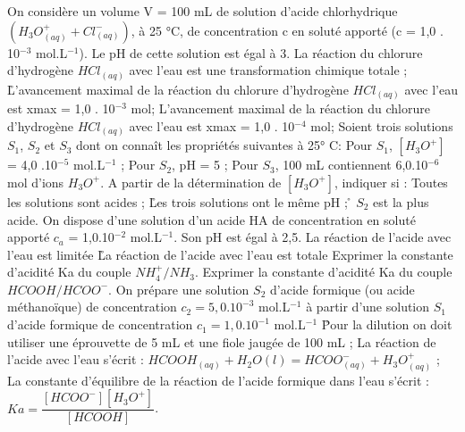 \q	
   On considère un volume V = 100 mL de solution d'acide chlorhydrique $(H_3O^+_{(aq)} + Cl^-_{(aq)})$, à 25 °C, de concentration c en soluté apporté (c = 1,0 . 10$^{-3}$ mol.L$^{-1}$). Le pH de cette solution est égal à 3. 
\rv
  La réaction du chlorure d'hydrogène $HCl_{(aq)}$ avec l'eau est une transformation chimique totale ;
\r
  L'avancement maximal de la réaction du chlorure d'hydrogène $HCl_{(aq)}$ avec l'eau est xmax = 1,0 . 10$^{-3}$ mol;
  \rv
  L'avancement maximal de la réaction du chlorure d'hydrogène $HCl_{(aq)}$ avec l'eau est xmax = 1,0 . 10$^{-4}$ mol;
 \q	
Soient trois solutions $S_1$, $S_2$ et $S_3$ dont on connaît les propriétés suivantes à 25° C:
Pour $S_1$, $[H_3O^+]$ = 4,0 .10$^{-5}$ mol.L$^{-1}$ ;
Pour $S_2$, pH = 5 ;
Pour $S_3$, 100 mL contiennent 6,0.10$^{-6}$ mol d'ions $H_3O^+$.
A partir de la détermination de $[H_3O^+]$, indiquer si :
\rv
Toutes les solutions sont acides ;
\r
Les trois solutions ont le même pH ;
\r
$S_2$ est la plus acide.
\q	
On dispose d'une solution d'un acide HA de concentration en soluté apporté $c_a$ = 1,0.10$^{-2}$  mol.L$^{-1}$. Son pH est égal à  2,5.
\rv
La réaction de l'acide avec l'eau est limitée 
\r
La réaction de l'acide avec l'eau est totale
\q	
Exprimer la constante d'acidité Ka du couple $NH_4^+/ NH_3$.
\q	Exprimer la constante d'acidité Ka du couple $HCOOH/HCOO^{-}$.
   \q	
On prépare une solution $S_2$ d'acide formique (ou acide méthanoïque) de concentration        $c_2 = 5,0 . 10^{-3}$ mol.L$^{-1}$ à partir d'une solution $S_1$ d'acide formique de concentration $c_1 =1,0 . 10^{-1}$ mol.L$^{-1}$ 
\r
Pour la dilution on doit utiliser une éprouvette de 5 mL et une fiole jaugée de 100 mL ;
\rv 
La réaction de l'acide avec l'eau s'écrit :
$HCOOH_{(aq)}+H_2O(l) = HCOO^{-} _{(aq)}+ H_3O^+ _{(aq)}$ ;
\rv
La constante d'équilibre de la réaction de l'acide formique dans l'eau s'écrit :
$Ka=\dfrac{[HCOO^{-}][H_3O^+]}{[HCOOH]}$.
